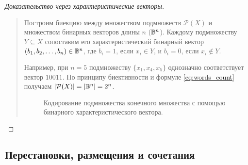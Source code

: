 \begin{proof}[Доказательство через характеристические векторы]~\\
    \begin{quote}
        Построим биекцию между множеством подмножеств $\mathcal{P}(X)$ и 
        множеством бинарных векторов длины $n$ ($\mathbb{B}^n$). Каждому 
        подмножеству $Y \subseteq X$ сопоставим его характеристический 
        бинарный вектор $(b_1, b_2, \dots, b_n) \in \mathbb{B}^n$, где $b_i = 1$, 
        если $x_i \in Y$, и $b_i = 0$, если $x_i \notin Y$.

        Например, при $n = 5$ подмножеству $\{x_1, x_4, x_5\}$ однозначно 
        соответствует вектор $10011$. По принципу биективности и формуле 
        \eqref{eq:words_count} получаем $\left| \mathcal{P}(X) \right| = \left| \mathbb{B}^n \right| = 2^n$.

        \begin{figure}[H]
            \centering
            \caption{Кодирование подмножества конечного множества с помощью 
            бинарного характеристического вектора.}
        \end{figure}
    \end{quote}
\end{proof}

\subsection{Перестановки, размещения и сочетания}

